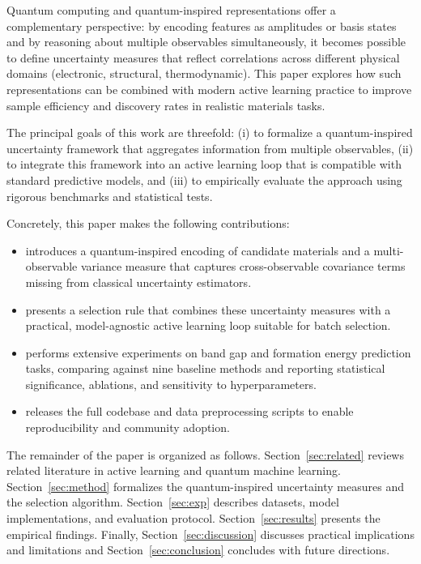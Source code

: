 \documentclass{article}
\begin{document}
Quantum computing and quantum-inspired representations offer a complementary perspective: by encoding features as amplitudes or basis states and by reasoning about multiple observables simultaneously, it becomes possible to define uncertainty measures that reflect correlations across different physical domains (electronic, structural, thermodynamic). This paper explores how such representations can be combined with modern active learning practice to improve sample efficiency and discovery rates in realistic materials tasks.

The principal goals of this work are threefold: (i) to formalize a quantum-inspired uncertainty framework that aggregates information from multiple observables, (ii) to integrate this framework into an active learning loop that is compatible with standard predictive models, and (iii) to empirically evaluate the approach using rigorous benchmarks and statistical tests.

Concretely, this paper makes the following contributions:
\begin{itemize}
    \item introduces a quantum-inspired encoding of candidate materials and a multi-observable variance measure that captures cross-observable covariance terms missing from classical uncertainty estimators.
    \item presents a selection rule that combines these uncertainty measures with a practical, model-agnostic active learning loop suitable for batch selection.
    \item performs extensive experiments on band gap and formation energy prediction tasks, comparing against nine baseline methods and reporting statistical significance, ablations, and sensitivity to hyperparameters.
    \item releases the full codebase and data preprocessing scripts to enable reproducibility and community adoption.
\end{itemize}

The remainder of the paper is organized as follows. Section~\ref{sec:related} reviews related literature in active learning and quantum machine learning. Section~\ref{sec:method} formalizes the quantum-inspired uncertainty measures and the selection algorithm. Section~\ref{sec:exp} describes datasets, model implementations, and evaluation protocol. Section~\ref{sec:results} presents the empirical findings. Finally, Section~\ref{sec:discussion} discusses practical implications and limitations and Section~\ref{sec:conclusion} concludes with future directions.
\end{document}
